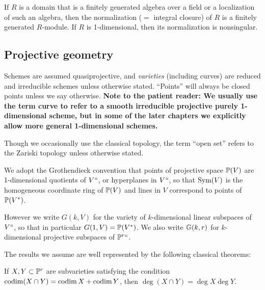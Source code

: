\begin{theorem}\label{finiteness of normalization}
 If $R$ is a domain that is a finitely generated algebra over a field or a localization of such an algebra, then the
normalization ($=$ integral closure) of $R$ is a finitely generated $R$-module.
If $R$ is 1-dimensional, then its normalization is nonsingular.
\end{theorem}

\subsection*{Projective geometry}
 
Schemes 
are assumed 
quasiprojective,
%
%
%
%
and \emph{varieties} (including
curves) are 
reduced and irreducible schemes
unless otherwise stated.
%
%
``Points''
will always be closed points unless we say otherwise. 
{\bf Note to the patient reader: We usually use the term curve to refer to a smooth irreducible projective purely 1-dimensional scheme, but in some of the later chapters we explicitly allow more general 1-dimensional schemes.}
%

Though we occasionally use the classical topology, 
the term ``open set'' refers to the 
Zariski topology
unless otherwise stated.
%

We adopt the 
Grothendieck convention
that points of projective space 
%
%
%
%
%
$\PP(V)$ are 1-dimensional quotients of $V` `$, or hyperplanes in $V` `$, so that
$\Sym(V)$ is the homogeneous coordinate ring of $\PP(V)$ and lines in $V$ correspond to points of $\PP(V^*)$.
%

However we write $G(k,V)$ for the variety of $k$-dimensional linear subspaces of $V` `$, so that in particular $G(1,V) = \PP(V^*)$.
We also write $\GG(k,r)$ for $k$-dimen\-sional
projective subspaces of $\PP^r` `$.

The results we assume are
 well represented by the following classical theorems:

\begin{theorem}
If $X,Y\subset \PP^r$ are subvarieties 
satisfying the condition
$\codim(X\cap Y) = \codim X + \codim Y$,
then $\deg (X\cap Y) = \deg X\deg Y$.%
%
\end{theorem}

